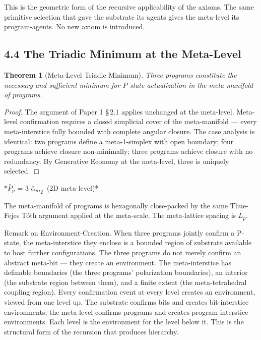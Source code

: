 \documentclass[11pt,oneside]{report}
\newtheorem{theorem}{Theorem}[section]
\theoremstyle{definition}
\theoremstyle{remark}
\begin{document}
This is the geometric form of the recursive applicability of the axioms.
The same primitive selection that gave the substrate its agents gives
the meta-level its program-agents. No new axiom is introduced.

\subsection*{4.4 The Triadic Minimum at the Meta-Level}

\begin{theorem}[Meta-Level Triadic Minimum]
Three programs constitute the
necessary and sufficient minimum for P-state actualization in the
meta-manifold of programs.
\end{theorem}

\begin{proof}
The argument of Paper 1 \S\,2.1 applies unchanged at the meta-level.
Meta-level confirmation requires a closed simplicial cover of the
meta-manifold --- every meta-interstice fully bounded with complete
angular closure. The case analysis is identical: two programs define a
meta-1-simplex with open boundary; four programs achieve closure
non-minimally; three programs achieve closure with no redundancy. By
Generative Economy at the meta-level, three is uniquely selected.

\end{proof}

\ensuremath{*\bar{P}_{p}} = 3 \ensuremath{\bar{\alpha}_{p},_{2}} (2D meta-level)*

The meta-manifold of programs is hexagonally close-packed by the same
Thue-Fejes Tóth argument applied at the meta-scale. The meta-lattice
spacing is \ensuremath{L_{p}.}

Remark on Environment-Creation. When three programs jointly confirm a
P-state, the meta-interstice they enclose is a bounded region of
substrate available to host further configurations. The three programs
do not merely confirm an abstract meta-bit --- they create an
environment. The meta-interstice has definable boundaries (the three
programs' polarization boundaries), an interior (the substrate region
between them), and a finite extent (the meta-tetrahedral coupling
region). Every confirmation event at every level creates an environment,
viewed from one level up. The substrate confirms bits and creates
bit-interstice environments; the meta-level confirms programs and
creates program-interstice environments. Each level is the environment
for the level below it. This is the structural form of the recursion
that produces hierarchy.
\end{document}
